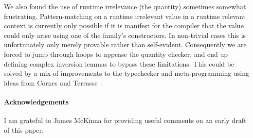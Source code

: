 \documentclass{article}
\begin{document}
We also found the use of runtime irrelevance (the  quantity)
sometimes somewhat frustrating.
%
Pattern-matching on a runtime irrelevant value in a runtime relevant context
is currently only possible if it is manifest for the compiler that the value
could only arise using one of the family's constructors.
%
In non-trivial cases this is unfortunately only merely provable rather than
self-evident.
%
Consequently we are forced to jump through hoops to appease the quantity
checker, and end up defining complex inversion lemmas to bypass these limitations.
This could be solved by a mix of improvements to the typechecker and
meta-programming using ideas from Cornes and Terrasse~\cite{DBLP:conf/types/CornesT95}.


\paragraph{Acknowledgements}
I am grateful to James McKinna for providing useful comments on an early
draft of this paper.


\end{document}
